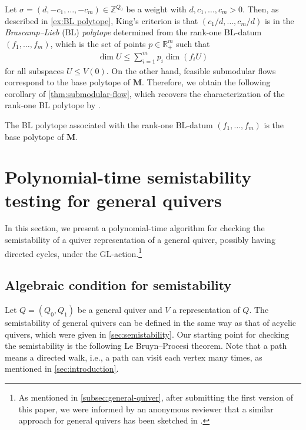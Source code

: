 \documentclass[a4paper,11pt]{article}
\numberwithin{equation}{section}
\newcommand{\R}{\mathbb{R}}
\newcommand{\Z}{\mathbb{Z}}
\begin{document}
Let $\sigma = (d, -c_1, \dotsc, -c_m) \in \Z^{Q_0}$ be a weight with $d, c_1, \dotsc, c_m > 0$.
Then, as described in \cref{ex:BL polytope}, King's criterion is that $(c_1/d, \dots, c_m/d)$ is in the \emph{Brascamp--Lieb} (BL) \emph{polytope} determined from the rank-one BL-datum $(f_1, \dots, f_m)$, which is the set of points $p \in \R_+^m$ such that
\begin{align}
    \dim U \le \sum_{i=1}^m p_i \dim (f_i U)
\end{align}
for all subspaces $U \le V(0)$.
On the other hand, feasible submodular flows correspond to the base polytope of $\mathbf{M}$.
Therefore, we obtain the following corollary of \cref{thm:submodular-flow}, which recovers the characterization of the rank-one BL polytope by \citet{Barthe1998}.

\begin{corollary}
    The BL polytope associated with the rank-one BL-datum $(f_1, \dots, f_m)$ is the base polytope of $\mathbf{M}$.
\end{corollary}









\section{Polynomial-time semistability testing for general quivers}\label{sec:general-ss}
In this section, we present a polynomial-time algorithm for checking the semistability of a quiver representation of a general quiver, possibly having directed cycles, under the GL-action.\footnote{As mentioned in \cref{subsec:general-quiver}, after submitting the first version of this paper, we were informed by an anonymous reviewer that a similar approach for general quivers has been sketched in \citet[Theorem~10.8 and the last paragraph of Section~10.2]{Mulmuley2017}.}

\subsection{Algebraic condition for semistability}
Let $Q = (Q_0, Q_1)$ be a general quiver and $V$ a representation of $Q$.
The semistability of general quivers can be defined in the same way as that of acyclic quivers, which were given in \cref{sec:semistability}.
Our starting point for checking the semistability is the following Le Bruyn--Procesi theorem.
Note that a path means a directed walk, i.e., a path can visit each vertex many times, as mentioned in \cref{sec:introduction}.
\end{document}
